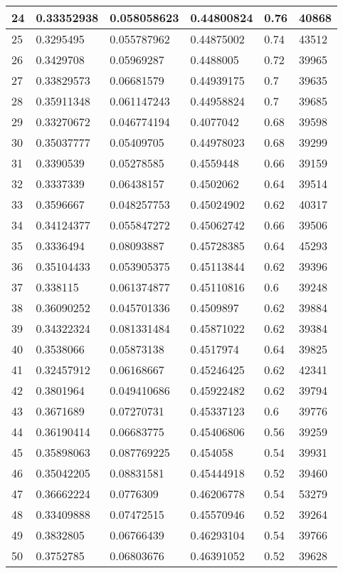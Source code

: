\begin{longtable}{|l|l|l|l|l|l|}
24 & 0.33352938 & 0.058058623 & 0.44800824 & 0.76 & 40868 \\ \hline 
25 & 0.3295495 & 0.055787962 & 0.44875002 & 0.74 & 43512 \\ \hline 
26 & 0.3429708 & 0.05969287 & 0.4488005 & 0.72 & 39965 \\ \hline 
27 & 0.33829573 & 0.06681579 & 0.44939175 & 0.7 & 39635 \\ \hline 
28 & 0.35911348 & 0.061147243 & 0.44958824 & 0.7 & 39685 \\ \hline 
29 & 0.33270672 & 0.046774194 & 0.4077042 & 0.68 & 39598 \\ \hline 
30 & 0.35037777 & 0.05409705 & 0.44978023 & 0.68 & 39299 \\ \hline 
31 & 0.3390539 & 0.05278585 & 0.4559448 & 0.66 & 39159 \\ \hline 
32 & 0.3337339 & 0.06438157 & 0.4502062 & 0.64 & 39514 \\ \hline 
33 & 0.3596667 & 0.048257753 & 0.45024902 & 0.62 & 40317 \\ \hline 
34 & 0.34124377 & 0.055847272 & 0.45062742 & 0.66 & 39506 \\ \hline 
35 & 0.3336494 & 0.08093887 & 0.45728385 & 0.64 & 45293 \\ \hline 
36 & 0.35104433 & 0.053905375 & 0.45113844 & 0.62 & 39396 \\ \hline 
37 & 0.338115 & 0.061374877 & 0.45110816 & 0.6 & 39248 \\ \hline 
38 & 0.36090252 & 0.045701336 & 0.4509897 & 0.62 & 39884 \\ \hline 
39 & 0.34322324 & 0.081331484 & 0.45871022 & 0.62 & 39384 \\ \hline 
40 & 0.3538066 & 0.05873138 & 0.4517974 & 0.64 & 39825 \\ \hline 
41 & 0.32457912 & 0.06168667 & 0.45246425 & 0.62 & 42341 \\ \hline 
42 & 0.3801964 & 0.049410686 & 0.45922482 & 0.62 & 39794 \\ \hline 
43 & 0.3671689 & 0.07270731 & 0.45337123 & 0.6 & 39776 \\ \hline 
44 & 0.36190414 & 0.06683775 & 0.45406806 & 0.56 & 39259 \\ \hline 
45 & 0.35898063 & 0.087769225 & 0.454058 & 0.54 & 39931 \\ \hline 
46 & 0.35042205 & 0.08831581 & 0.45444918 & 0.52 & 39460 \\ \hline 
47 & 0.36662224 & 0.0776309 & 0.46206778 & 0.54 & 53279 \\ \hline 
48 & 0.33409888 & 0.07472515 & 0.45570946 & 0.52 & 39264 \\ \hline 
49 & 0.3832805 & 0.06766439 & 0.46293104 & 0.54 & 39766 \\ \hline 
50 & 0.3752785 & 0.06803676 & 0.46391052 & 0.52 & 39628 \\ \hline 
\end{longtable}